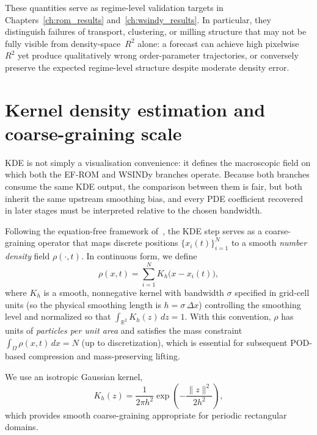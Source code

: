 These quantities serve as regime-level validation targets in
Chapters~\ref{ch:rom_results} and~\ref{ch:wsindy_results}.  In particular,
they distinguish failures of transport, clustering, or milling structure
that may not be fully visible from density-space~$R^2$ alone: a forecast
can achieve high pixelwise~$R^2$ yet produce qualitatively wrong
order-parameter trajectories, or conversely preserve the expected
regime-level structure despite moderate density error.



\section{Kernel density estimation and coarse-graining scale}
\label{subsec:kde}

KDE is not simply a visualisation convenience: it defines the macroscopic field on which both the EF-ROM and WSINDy branches operate.  Because both branches consume the same KDE output, the comparison between them is fair, but both inherit the same upstream smoothing bias, and every
PDE coefficient recovered in later stages must be interpreted relative
to the chosen bandwidth.

Following the equation-free framework of~\cite{alvarez2025eqfree}, the KDE step serves as a coarse-graining operator that maps discrete positions $\{x_i(t)\}_{i=1}^N$ to a smooth \emph{number density} field $\rho(\cdot,t)$.
In continuous form, we define
\begin{equation}
\rho(x,t)
=
\sum_{i=1}^N K_h\!\bigl(x-x_i(t)\bigr),
\label{eq:kde_def}
\end{equation}
where $K_h$ is a smooth, nonnegative kernel with bandwidth $\sigma$ specified in grid-cell units (so the physical smoothing length is $h=\sigma\,\Delta x$) controlling the smoothing level and normalized so that
$\int_{\mathbb{R}^2} K_h(z)\,dz = 1$.
With this convention, $\rho$ has units of \emph{particles per unit area} and satisfies the mass constraint
$\int_\Omega \rho(x,t)\,dx = N$ (up to discretization), which is essential for subsequent POD-based compression and mass-preserving lifting.

We use an isotropic Gaussian kernel,
\begin{equation}
K_h(z)
=
\frac{1}{2\pi h^2}
\exp\!\left(-\frac{\|z\|^2}{2h^2}\right),
\label{eq:gaussian_kernel}
\end{equation}
which provides smooth coarse-graining appropriate for periodic rectangular domains.

